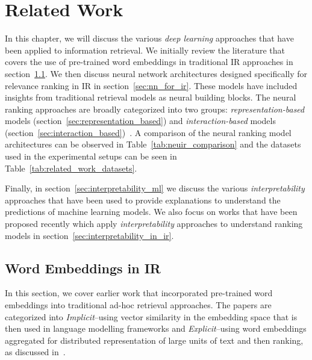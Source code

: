 
\chapter{Related Work} %

\label{Chapter2} %


In this chapter, we will discuss the various \textit{deep learning} approaches that have been applied to information retrieval. We initially review the literature that covers the use of pre-trained word embeddings in traditional IR approaches in section~\ref{sec:word_embeddings_ir}. We then discuss  neural network architectures designed specifically for relevance ranking in IR in section~\ref{sec:nn_for_ir}. These models have included insights from traditional retrieval models as neural building blocks. The neural ranking approaches are broadly categorized into two groups: \textit{representation-based} models (section~\ref{sec:representation_based}) and \textit{interaction-based} models (section~\ref{sec:interaction_based})~\citep{Guo2016}. A comparison of the neural ranking model architectures can be observed in Table~\ref{tab:neuir_comparison} and the datasets used in the experimental setups can be seen in Table~\ref{tab:related_work_datasets}.

Finally, in section~\ref{sec:interpretability_ml} we discuss the various \textit{interpretability} approaches that have been used to provide explanations to understand the predictions of machine learning models. We also focus on works that have been proposed recently which apply \textit{interpretability} approaches to understand ranking models in section~\ref{sec:interpretability_in_ir}.

\section{Word Embeddings in IR}
\label{sec:word_embeddings_ir}

In this section, we cover earlier work that incorporated pre-trained word embeddings into traditional ad-hoc retrieval approaches. The papers are categorized into \textit{Implicit}--using vector similarity in the embedding space that is then used in language modelling frameworks and \textit{Explicit}--using word embeddings aggregated for distributed representation of large units of text and then ranking, as discussed in~\citep{Onal_NIR2018}.

